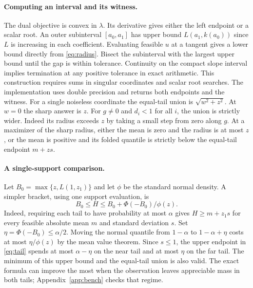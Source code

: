 \documentclass[11pt]{article}
\begin{document}
\paragraph{Computing an interval and its witness.}
The dual objective is convex in $\lambda$. Its derivative gives either the left endpoint or a scalar root. An outer subinterval $[a_0,a_1]$ has upper bound $L(a_1,k(a_0))$ since $L$ is increasing in each coefficient. Evaluating feasible $u$ at a tangent gives a lower bound directly from \eqref{eq:radius}. Bisect the subinterval with the largest upper bound until the gap is within tolerance. Continuity on the compact slope interval implies termination at any positive tolerance in exact arithmetic. This construction requires sums in singular coordinates and scalar root searches. The implementation uses double precision and returns both endpoints and the witness. For a single noiseless coordinate the equal-tail union is $\sqrt{w^2+z^2}$. At $w=0$ the sharp answer is $z$. For $g\ne0$ and $d_i<1$ for all $i$, the union is strictly wider. Indeed its radius exceeds $z$ by taking a small step from zero along $g$. At a maximizer of the sharp radius, either the mean is zero and the radius is at most $z$, or the mean is positive and its folded quantile is strictly below the equal-tail endpoint $m+zs$.

\paragraph{A single-support comparison.}
Let $B_0=\max\{z,L(1,z_1)\}$ and let $\phi$ be the standard normal density. A simpler bracket, using one support evaluation, is
\begin{equation}
 B_0\le H\le B_0+\Phi(-B_0)/\phi(z).
 \label{eq:tail}
\end{equation}
Indeed, requiring each tail to have probability at most $\alpha$ gives $H\ge m+z_1s$ for every feasible absolute mean $m$ and standard deviation $s$. Set $\eta=\Phi(-B_0)\le\alpha/2$. Moving the normal quantile from $1-\alpha$ to $1-\alpha+\eta$ costs at most $\eta/\phi(z)$ by the mean value theorem. Since $s\le1$, the upper endpoint in \eqref{eq:tail} spends at most $\alpha-\eta$ on the near tail and at most $\eta$ on the far tail. The minimum of this upper bound and the equal-tail union is also valid. The exact formula can improve the most when the observation leaves appreciable mass in both tails; Appendix~\ref{app:bench} checks that regime.
\end{document}
